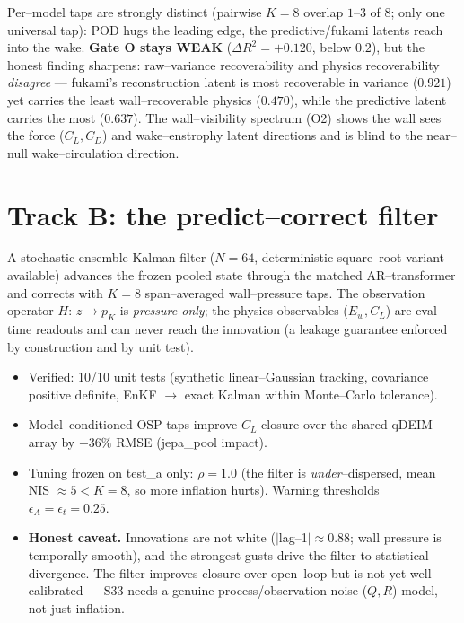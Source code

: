 \documentclass[11pt]{article}
\newcommand{\weak}{\textcolor{orange!80!black}{\textbf{WEAK}}}
\begin{document}
Per--model taps are strongly distinct (pairwise $K{=}8$ overlap $1$--$3$ of $8$; only one
universal tap): POD hugs the leading edge, the predictive/fukami latents reach into the wake.
\textbf{Gate O stays \weak} ($\Delta R^2 = +0.120$, below $0.2$), but the honest finding sharpens:
raw--variance recoverability and physics recoverability \emph{disagree} --- fukami's
reconstruction latent is most recoverable in variance ($0.921$) yet carries the least
wall--recoverable physics ($0.470$), while the predictive latent carries the most ($0.637$). The
wall--visibility spectrum (O2) shows the wall sees the force ($C_L,C_D$) and wake--enstrophy latent
directions and is blind to the near--null wake--circulation direction.

\section{Track B: the predict--correct filter}

A stochastic ensemble Kalman filter ($N{=}64$, deterministic square--root variant available)
advances the frozen pooled state through the matched AR--transformer and corrects with
$K{=}8$ span--averaged wall--pressure taps. The observation operator $H\!:\,z\to p_K$ is
\emph{pressure only}; the physics observables ($E_w, C_L$) are eval--time readouts and can never
reach the innovation (a leakage guarantee enforced by construction and by unit test).

\begin{itemize}[leftmargin=1.4em,itemsep=1pt]
\item Verified: 10/10 unit tests (synthetic linear--Gaussian tracking, covariance positive
definite, EnKF $\to$ exact Kalman within Monte--Carlo tolerance).
\item Model--conditioned OSP taps improve $C_L$ closure over the shared qDEIM array by $-36\%$
RMSE (jepa\_pool impact).
\item Tuning frozen on test\_a only: $\rho{=}1.0$ (the filter is \emph{under}--dispersed, mean
NIS $\approx 5 < K{=}8$, so more inflation hurts). Warning thresholds $\epsilon_A=\epsilon_t=0.25$.
\item \textbf{Honest caveat.} Innovations are not white ($|$lag--1$|\approx 0.88$; wall pressure
is temporally smooth), and the strongest gusts drive the filter to statistical divergence. The
filter improves closure over open--loop but is not yet well calibrated --- S33 needs a genuine
process/observation noise ($Q,R$) model, not just inflation.
\end{itemize}
\end{document}
